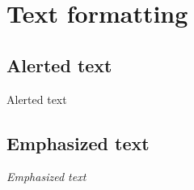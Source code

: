 \documentclass{beamer}
\begin{document}
    \section{Text formatting}
    \subsection{Alerted text}
    \begin{frame}
        \alert{Alerted text}
    \end{frame}
    \subsection{Emphasized text}
    \begin{frame}
        \emph{Emphasized text}
    \end{frame}
\end{document}

